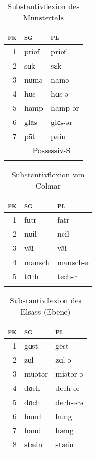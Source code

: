 \begin{table}[H]
	\caption{Substantivflexion des Münstertals \citep[40-44]{Mankel1886}}\label{table18}
	\begin{tabular}{rll}
		\lsptoprule
		\textsc{fk} & \textsc{sg} & \textsc{pl}\\\midrule
		1 & prief & prief\\
		2 & sɑk & sɛk\\
		3 & nɑmə & namə\\
		4 & hɑs & hɑs-ə\\
		5 & hamp & hamp-ər\\
		6 & glɑs & glɛs-ər\\
		7 & p\~{\=a}t & pain\\
		& \multicolumn{2}{c}{Possessiv-S}\\
		\lspbottomrule
	\end{tabular}
\end{table}


\begin{table}[H]
	\caption{Substantivflexion von Colmar \citep[71-76]{Henry1900}}\label{table19}
	\begin{tabular}{rll}
		\lsptoprule
		\textsc{fk} & \textsc{sg} & \textsc{pl}\\\midrule
		1 & fɑtr & fatr\\
		2 & nɑil & neil\\
		3 & v\=ai & v\=ai\\
		4 & mansch & mansch-ə\\
		5 & tɑch & tech-r\\
		\lspbottomrule
	\end{tabular}
\end{table}


\begin{table}[H]
	\caption{Substantivflexion des Elsass (Ebene) \citep[25-71]{Beyer1963}}\label{table20}
	\begin{tabular}{rll}
		\lsptoprule
		\textsc{fk} & \textsc{sg} & \textsc{pl}\\\midrule
		1 & gɑst & gest\\
		2 & zɑl & zɑl-ə\\
		3 & müətər & miətər-ə\\
		4 & dɑch & dech-ər\\
		5 & dɑch & dech-ərə\\
		6 & hund & hung\\
		7 & hand & hæng\\
		8 & stæin & stæin\\
		\lspbottomrule
	\end{tabular}
\end{table}

